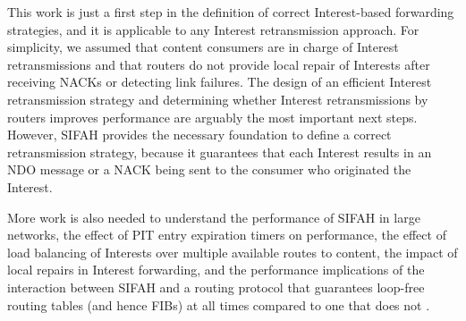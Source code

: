 \documentclass{ancs15-alternate}
\begin{document}
This  work is just a first step in  the definition of correct Interest-based  forwarding strategies, and it is applicable to any Interest retransmission approach. For simplicity, we assumed that content consumers are in charge of Interest retransmissions and that routers do not provide local repair of Interests after receiving NACKs or detecting link failures. The design of an efficient Interest retransmission strategy and determining whether Interest retransmissions by routers improves performance are arguably the most important next steps.  However, SIFAH provides the necessary foundation to define a correct retransmission strategy, because it guarantees that each Interest results in an NDO message or a NACK being sent to the consumer who originated the Interest.

More work is also needed to understand the performance of SIFAH in large networks, the effect of PIT entry expiration  timers on performance, the effect of load balancing of Interests over multiple available routes to content, the impact of local repairs in Interest forwarding,  and the performance implications of the interaction between
SIFAH  and a routing protocol that guarantees loop-free routing tables (and hence FIBs) at all times \cite{dcr, icnp14,  dcr-mcast} compared to one that does not \cite{nlsr}.
\end{document}
